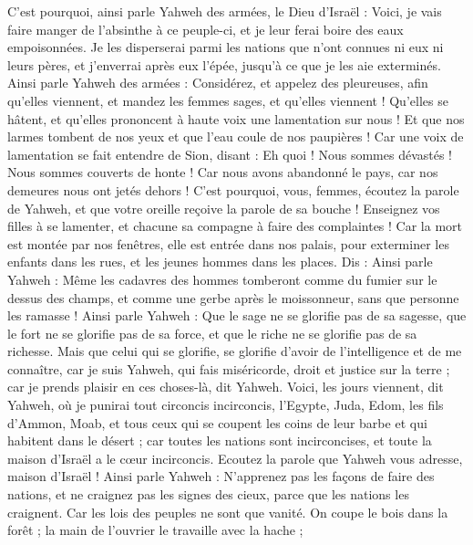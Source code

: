 \begin{multicols}{2}
C'est pourquoi, ainsi parle Yahweh des armées, le Dieu d'Israël : Voici, je vais faire manger de l'absinthe à ce peuple-ci, et je leur ferai boire des eaux empoisonnées.
Je les disperserai parmi les nations que n'ont connues ni eux ni leurs pères, et j'enverrai après eux l'épée, jusqu'à ce que je les aie exterminés.
Ainsi parle Yahweh des armées : Considérez, et appelez des pleureuses, afin qu'elles viennent, et mandez les femmes sages, et qu'elles viennent !
Qu'elles se hâtent, et qu'elles prononcent à haute voix une lamentation sur nous ! Et que nos larmes tombent de nos yeux et que l'eau coule de nos paupières !
Car une voix de lamentation se fait entendre de Sion, disant : Eh quoi ! Nous sommes dévastés ! Nous sommes couverts de honte ! Car nous avons abandonné le pays, car nos demeures nous ont jetés dehors !
C'est pourquoi, vous, femmes, écoutez la parole de Yahweh, et que votre oreille reçoive la parole de sa bouche ! Enseignez vos filles à se lamenter, et chacune sa compagne à faire des complaintes !
Car la mort est montée par nos fenêtres, elle est entrée dans nos palais, pour exterminer les enfants dans les rues, et les jeunes hommes dans les places.
Dis : Ainsi parle Yahweh : Même les cadavres des hommes tomberont comme du fumier sur le dessus des champs, et comme une gerbe après le moissonneur, sans que personne les ramasse !
Ainsi parle Yahweh : Que le sage ne se glorifie pas de sa sagesse, que le fort ne se glorifie pas de sa force, et que le riche ne se glorifie pas de sa richesse.
Mais que celui qui se glorifie, se glorifie d'avoir de l'intelligence et de me connaître, car je suis Yahweh, qui fais miséricorde, droit et justice sur la terre ; car je prends plaisir en ces choses-là, dit Yahweh.
Voici, les jours viennent, dit Yahweh, où je punirai tout circoncis incirconcis,
l'Egypte, Juda, Edom, les fils d'Ammon, Moab, et tous ceux qui se coupent les coins de leur barbe et qui habitent dans le désert ; car toutes les nations sont incirconcises, et toute la maison d'Israël a le cœur incirconcis.
\VerseOne{}Ecoutez la parole que Yahweh vous adresse, maison d'Israël !
Ainsi parle Yahweh : N'apprenez pas les façons de faire des nations, et ne craignez pas les signes des cieux, parce que les nations les craignent.
Car les lois des peuples ne sont que vanité. On coupe le bois dans la forêt ; la main de l'ouvrier le travaille avec la hache ;

\end{multicols}
